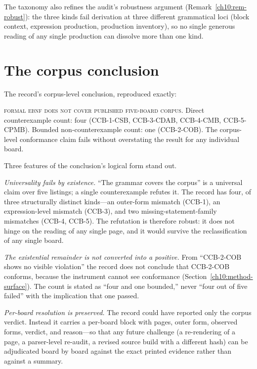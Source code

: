 The taxonomy also refines the audit's robustness argument (Remark~\ref{ch10:rem-robust}): the three kinds fail derivation at three different grammatical loci (block context, expression production, production inventory), so no single generous reading of any single production can dissolve more than one kind.

\section{The corpus conclusion}\label{ch10:corpus}

The record's corpus-level conclusion, reproduced exactly:

\begin{finding}\label{ch10:find-corpus}
\textsc{formal ebnf does not cover published five-board corpus}. Direct counterexample count: four (CCB-1-CSB, CCB-3-CDAB, CCB-4-CMB, CCB-5-CPMB). Bounded non-counterexample count: one (CCB-2-COB). The corpus-level conformance claim fails without overstating the result for any individual board.
\end{finding}

Three features of the conclusion's logical form stand out.

\emph{Universality fails by existence.} ``The grammar covers the corpus'' is a universal claim over five listings; a single counterexample refutes it. The record has four, of three structurally distinct kinds---an outer-form mismatch (CCB-1), an expression-level mismatch (CCB-3), and two missing-statement-family mismatches (CCB-4, CCB-5). The refutation is therefore robust: it does not hinge on the reading of any single page, and it would survive the reclassification of any single board.

\emph{The existential remainder is not converted into a positive.} From ``CCB-2-COB shows no visible violation'' the record does not conclude that CCB-2-COB conforms, because the instrument cannot see conformance (Section~\ref{ch10:method-surface}). The count is stated as ``four and one bounded,'' never ``four out of five failed'' with the implication that one passed.

\emph{Per-board resolution is preserved.} The record could have reported only the corpus verdict. Instead it carries a per-board block with pages, outer form, observed forms, verdict, and reason---so that any future challenge (a re-rendering of a page, a parser-level re-audit, a revised source build with a different hash) can be adjudicated board by board against the exact printed evidence rather than against a summary.

